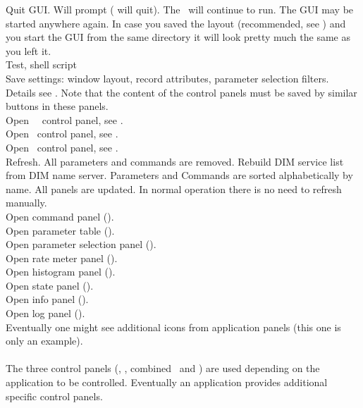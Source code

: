  Quit GUI. Will prompt ( will quit). The \dabc\ will continue to run.
The GUI may be started anywhere again. In case you saved the layout (recommended, see )
and you start the GUI from the same directory it will look pretty much the same as you left it. \\
 Test, shell script\\
 Save settings: window layout, record attributes, parameter selection filters.
Details see . Note that the content of the control panels
must be saved by similar buttons in these panels.\\
 Open \dabc\ \mbs\ control panel, see .\\
 Open \dabc\ control panel, see .\\
 Open \mbs\ control panel, see .\\
 Refresh. All parameters and commands are removed. 
Rebuild DIM service list from DIM name server.
Parameters and Commands are sorted alphabetically by name.
All panels are updated.
In normal operation there is no need to refresh manually.\\
 Open command panel ().\\
 Open parameter table ().\\
 Open parameter selection panel ().\\
 Open rate meter panel ().\\
 Open histogram panel ().\\
 Open state panel ().\\
 Open info panel ().\\
 Open log panel ().\\
 Eventually one might see additional icons from application panels
(this one is only an example).\\\\
The three control panels (\dabc, \mbs, combined \dabc\ and \mbs) 
are used depending on the
application to be controlled. Eventually an application provides 
additional specific control panels.

